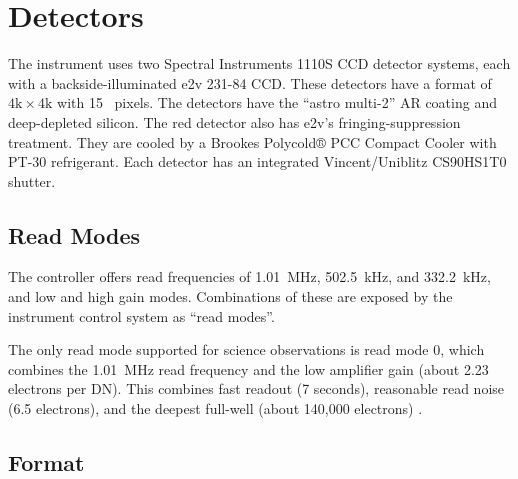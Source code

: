 \chapter{Detectors}

The instrument uses two Spectral Instruments 1110S CCD detector systems, each with a backside-illuminated e2v 231-84 CCD. These detectors have a format of $4\mathrm{k}\times4\mathrm{k}$ with 15~{\micron} pixels. The detectors have the “astro multi-2” AR coating and deep-depleted silicon. The red detector also has e2v's fringing-suppression treatment. They are cooled by a Brookes Polycold® PCC Compact Cooler with PT-30 refrigerant. Each detector has an integrated Vincent/Uniblitz CS90HS1T0 shutter.

\section{Read Modes}

The controller offers read frequencies of 1.01~MHz, 502.5~kHz, and 332.2~kHz, and low and high gain modes. Combinations of these are exposed by the instrument control system as “read modes”. 

The only read mode supported for science observations is read mode 0, which combines the  1.01~MHz read frequency and the low amplifier gain (about 2.23 electrons per DN). This combines fast readout (7 seconds), reasonable read noise (6.5 electrons), and the deepest full-well (about 140,000 electrons) \citep{laboratory}. 

\section{Format}

